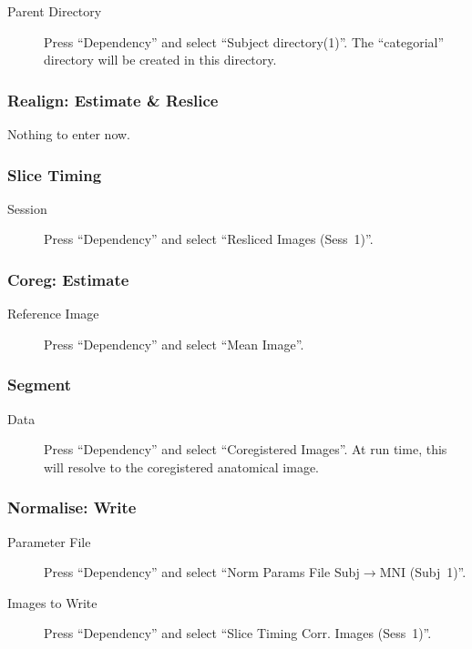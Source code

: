 \begin{description}
\item[Parent Directory] Press ``Dependency'' and select ``Subject
  directory(1)''. The ``categorial'' directory will be created in this
  directory. 
\end{description}

\subsubsection*{Realign: Estimate \& Reslice}

Nothing to enter now.

\subsubsection*{Slice Timing}

\begin{description}
\item[Session] Press ``Dependency'' and select ``Resliced Images (Sess~1)''.
\end{description}

\subsubsection*{Coreg: Estimate}

\begin{description}
\item[Reference Image] Press ``Dependency'' and select ``Mean Image''.
\end{description}

\subsubsection*{Segment}

\begin{description}
\item[Data] Press ``Dependency'' and select ``Coregistered Images''. At run
  time, this will resolve to the coregistered anatomical image.
\end{description}

\subsubsection*{Normalise: Write}

\begin{description}
\item[Parameter File] Press ``Dependency'' and select ``Norm Params File
  Subj$\rightarrow$MNI (Subj~1)''.
\item[Images to Write] Press ``Dependency'' and select ``Slice Timing
  Corr. Images (Sess~1)''. 
\end{description}

